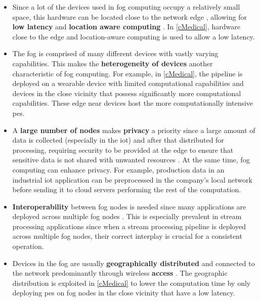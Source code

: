 \begin{itemize}
    \item Since a lot of the devices used in fog computing occupy a relatively small space, this hardware can be located close to the network edge \cite{Yousefpour.2019}, allowing for \textbf{low latency} and \textbf{location aware computing} \cite{Bonomi.2012, Yigitoglu.2017}. In \ref{cMedical}, hardware close to the edge and location-aware computing is used to allow a low latency.
    \item The fog is comprised of many different devices with vastly varying capabilities. This makes the \textbf{heterogeneity of devices} \cite{Bonomi.2012} another characteristic of fog computing. For example, in \ref{cMedical}, the pipeline is deployed on a wearable device with limited computational capabilities and devices in the close vicinity that possess significantly more computational capabilities. These edge near devices host the more computationally intensive \gls{pe}s.
    \item A \textbf{large number of nodes} makes \textbf{privacy} a priority \cite{Yigitoglu.2017} since a large amount of data is collected (especially in the \gls{iot}) and after that distributed for processing, requiring security to be provided at the edge to ensure that sensitive data is not shared with unwanted resources \cite{Yigitoglu.2017}. At the same time, fog computing can enhance privacy. For example, production data in an industrial \gls{iot} application can be preprocessed in the company's local network before sending it to cloud servers performing the rest of the computation.
    \item \textbf{Interoperability} between fog nodes is needed since many applications are deployed across multiple fog nodes \cite{Bonomi.2012}. This is especially prevalent in stream processing applications since when a stream processing pipeline is deployed across multiple fog nodes, their correct interplay is crucial for a consistent operation.
    \item Devices in the fog are usually \textbf{geographically distributed} \cite{Bonomi.2012} and connected to the network predominantly through wireless \textbf{access} \cite{Osanaiye.2017, Bonomi.2012, Baccarelli.2018}. The geographic distribution is exploited in \ref{cMedical} to lower the computation time by only deploying \gls{pe}s on fog nodes in the close vicinity that have a low latency.
\end{itemize}

